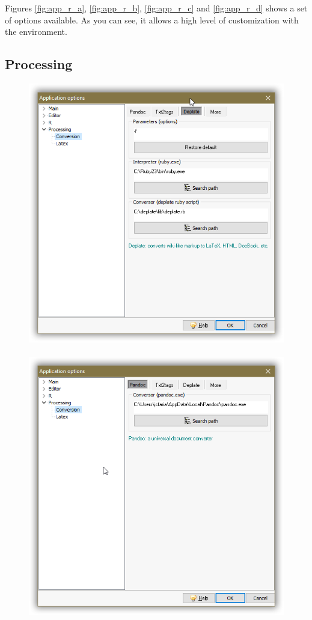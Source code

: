 Figures \ref{fig:app_r_a},
        \ref{fig:app_r_b},
        \ref{fig:app_r_c} and
        \ref{fig:app_r_d}
shows a set of options available. As you can see, it allows a high level
of customization with the \RR{} environment.


\hypertarget{working_app_processing}{}
\subsection{Processing}

\begin{figure}[h!]
  \includegraphics[scale=0.35]{./res/app_processing_conversion_deplate.png}~~
  \includegraphics[scale=0.35]{./res/app_processing_conversion_pandoc.png}\\

\end{figure}
